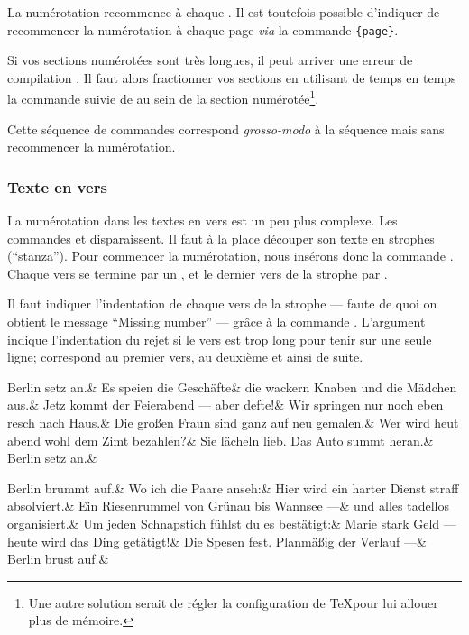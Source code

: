 La numérotation recommence à chaque . Il est toutefois possible d'indiquer de recommencer la numérotation  à chaque page \emph{via} la commande \verb={page}=. \label{lineation}

\begin{attention}
Si vos sections numérotées sont très longues, il peut arriver une erreur de compilation . Il faut alors fractionner vos sections en utilisant de temps en temps la commande  suivie de  au sein de  la section numérotée\footnote{Une autre solution serait de régler la configuration de \TeX pour lui allouer plus de mémoire.}. 

Cette séquence de commandes correspond \emph{grosso-modo} à la séquence  mais sans recommencer la numérotation.
\end{attention}

\subsubsection{Texte en vers}

La  numérotation dans les textes en vers est un peu plus complexe. Les commandes  et  disparaissent. Il faut à la place découper son texte en strophes (\enquote{stanza}). Pour commencer la numérotation, nous insérons donc la commande . Chaque vers se termine par un \ampersand, et le dernier vers de la strophe par \cs{\ampersand}.  

Il faut indiquer l'indentation de chaque vers de la strophe --- faute de quoi on obtient le message \enquote{Missing number} --- grâce à la commande . L'argument  indique l'indentation du rejet si le vers est trop long pour tenir sur une seule ligne;  correspond au premier vers,  au deuxième et ainsi de suite.



\begin{latexcode}
\beginnumbering
{}
\let\endstanzaextra\bigbreak
\stanza
Berlin setz an.&
Es speien die Geschäfte&
die wackern Knaben und die Mädchen aus.&
Jetz kommt der Feierabend --- aber defte!&
Wir springen nur noch eben resch nach Haus.&
Die großen Fraun sind ganz auf neu gemalen.&
Wer wird heut abend wohl dem Zimt bezahlen?&
Sie lächeln lieb. Das Auto summt heran.&
Berlin setz an.\&

\stanza
Berlin brummt auf.&
Wo ich die Paare anseh:&
Hier wird ein harter Dienst straff absolviert.&
Ein Riesenrummel von Grünau bis Wannsee ---&
und alles tadellos organisiert.&
Um jeden Schnapstich fühlst du es bestätigt:&
Marie stark Geld --- heute wird das Ding getätigt!&
Die Spesen fest. Planmäßig der Verlauf ---&
Berlin brust auf.\&
\endnumbering
\end{latexcode}

